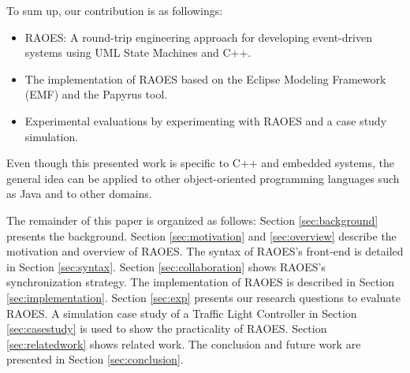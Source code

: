 To sum up, our contribution is as followings:
\begin{itemize}
	\item RAOES: A round-trip engineering approach for developing event-driven systems using UML State Machines and C++.
	\item The implementation of RAOES based on the Eclipse Modeling Framework (EMF) and the Papyrus tool.
	\item Experimental evaluations by experimenting with RAOES and a case study simulation.
\end{itemize}

Even though this presented work is specific to C++ and embedded systems, the general idea can be applied to other object-oriented programming languages such as Java and to other domains.

The remainder of this paper is organized as follows: Section \ref{sec:background} presents the background. 
Section \ref{sec:motivation} and \ref{sec:overview} describe the motivation and overview of RAOES. 
The syntax of RAOES's front-end is detailed in Section \ref{sec:syntax}.
Section \ref{sec:collaboration} shows RAOES's synchronization strategy.
The implementation of RAOES is described in Section \ref{sec:implementation}. 
Section \ref{sec:exp} presents our research questions to evaluate RAOES. 
A simulation case study of a Traffic Light Controller in Section \ref{sec:casestudy} is used to show the practicality of RAOES.  
Section \ref{sec:relatedwork} shows related work. 
The conclusion and future work are presented in Section \ref{sec:conclusion}.

